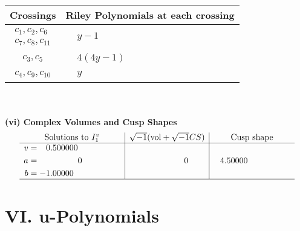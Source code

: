 \documentclass[1p]{elsarticle_modified}
\theoremstyle{definition}
\newcommand{\I}{\sqrt{-1}}
\begin{document}
\begin{tabular}{m{50pt}|m{274pt}}
Crossings & \hspace{64pt}Riley Polynomials at each crossing \\
\hline $$\begin{aligned}c_{1},c_{2},c_{6}\\c_{7},c_{8},c_{11}\end{aligned}$$&$\begin{aligned}
&y-1
\end{aligned}$\\
\hline $$\begin{aligned}c_{3},c_{5}\end{aligned}$$&$\begin{aligned}
&4(4 y-1)
\end{aligned}$\\
\hline $$\begin{aligned}c_{4},c_{9},c_{10}\end{aligned}$$&$\begin{aligned}
&y
\end{aligned}$\\
\hline
\end{tabular}\\~\\
\newpage\flushleft \textbf{(vi) Complex Volumes and Cusp Shapes}
$$\begin{array}{c|c|c}  
\text{Solutions to }I^v_{1}& \I (\text{vol} + \sqrt{-1}CS) & \text{Cusp shape}\\
 \hline 
\begin{aligned}
v &= \phantom{-}0.500000\phantom{ +0.000000I} \\
a &= \phantom{-0.000000 } 0 \\
b &= -1.00000\phantom{ +0.000000I}\end{aligned}
 & \phantom{-0.000000 } 0 & \phantom{-}4.50000\phantom{ +0.000000I}\\
 \hline 
 \end{array}$$\newpage
\newpage\renewcommand{\arraystretch}{1}
\centering \section*{ VI. u-Polynomials}
\end{document}
